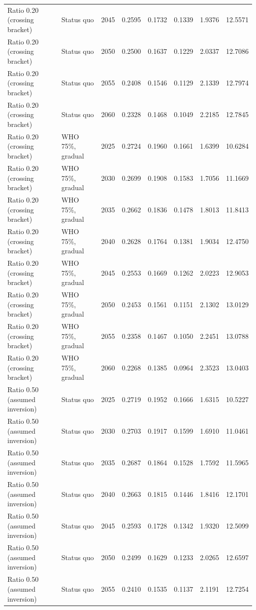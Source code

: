\begin{longtable}{llrrrrrr}
Ratio 0.20 (crossing bracket) & Status quo & 2045 & 0.2595 & 0.1732 & 0.1339 & 1.9376 & 12.5571 \\
Ratio 0.20 (crossing bracket) & Status quo & 2050 & 0.2500 & 0.1637 & 0.1229 & 2.0337 & 12.7086 \\
Ratio 0.20 (crossing bracket) & Status quo & 2055 & 0.2408 & 0.1546 & 0.1129 & 2.1339 & 12.7974 \\
Ratio 0.20 (crossing bracket) & Status quo & 2060 & 0.2328 & 0.1468 & 0.1049 & 2.2185 & 12.7845 \\
Ratio 0.20 (crossing bracket) & WHO 75\%, gradual & 2025 & 0.2724 & 0.1960 & 0.1661 & 1.6399 & 10.6284 \\
Ratio 0.20 (crossing bracket) & WHO 75\%, gradual & 2030 & 0.2699 & 0.1908 & 0.1583 & 1.7056 & 11.1669 \\
Ratio 0.20 (crossing bracket) & WHO 75\%, gradual & 2035 & 0.2662 & 0.1836 & 0.1478 & 1.8013 & 11.8413 \\
Ratio 0.20 (crossing bracket) & WHO 75\%, gradual & 2040 & 0.2628 & 0.1764 & 0.1381 & 1.9034 & 12.4750 \\
Ratio 0.20 (crossing bracket) & WHO 75\%, gradual & 2045 & 0.2553 & 0.1669 & 0.1262 & 2.0223 & 12.9053 \\
Ratio 0.20 (crossing bracket) & WHO 75\%, gradual & 2050 & 0.2453 & 0.1561 & 0.1151 & 2.1302 & 13.0129 \\
Ratio 0.20 (crossing bracket) & WHO 75\%, gradual & 2055 & 0.2358 & 0.1467 & 0.1050 & 2.2451 & 13.0788 \\
Ratio 0.20 (crossing bracket) & WHO 75\%, gradual & 2060 & 0.2268 & 0.1385 & 0.0964 & 2.3523 & 13.0403 \\
Ratio 0.50 (assumed inversion) & Status quo & 2025 & 0.2719 & 0.1952 & 0.1666 & 1.6315 & 10.5227 \\
Ratio 0.50 (assumed inversion) & Status quo & 2030 & 0.2703 & 0.1917 & 0.1599 & 1.6910 & 11.0461 \\
Ratio 0.50 (assumed inversion) & Status quo & 2035 & 0.2687 & 0.1864 & 0.1528 & 1.7592 & 11.5965 \\
Ratio 0.50 (assumed inversion) & Status quo & 2040 & 0.2663 & 0.1815 & 0.1446 & 1.8416 & 12.1701 \\
Ratio 0.50 (assumed inversion) & Status quo & 2045 & 0.2593 & 0.1728 & 0.1342 & 1.9320 & 12.5099 \\
Ratio 0.50 (assumed inversion) & Status quo & 2050 & 0.2499 & 0.1629 & 0.1233 & 2.0265 & 12.6597 \\
Ratio 0.50 (assumed inversion) & Status quo & 2055 & 0.2410 & 0.1535 & 0.1137 & 2.1191 & 12.7254 \\

\end{longtable}
